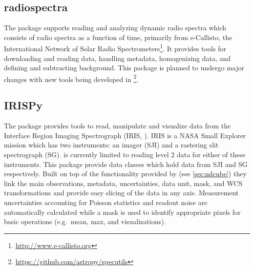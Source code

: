 \subsection{radiospectra}
The  package supports reading and analyzing dynamic radio spectra which consists of radio spectra as a function of time, primarily from e-Callisto, the International Network of Solar Radio Spectrometers\footnote{\url{http://www.e-callisto.org}}.
It provides tools for downloading and reading data, handling metadata, homogenizing data, and defining and subtracting background.
This package is planned to undergo major changes with new tools being developed in \footnote{\url{https://github.com/astropy/specutils}}.

\subsection{IRISPy}
\label{sec:irispy}

The  package provides tools to read, manipulate and visualize data from the Interface Region Imaging Spectrograph (IRIS, \citealt{DePontieu2014}).
IRIS is a NASA Small Explorer mission which has two instruments: an imager (SJI) and a rastering slit spectrograph (SG).
 is currently limited to reading level 2 data for either of these instruments.
This package provide data classes which hold data from SJI and SG respectively.
Built on top of the functionality provided by  (see \autoref{sec:ndcube}) they link the main observations, metadata, uncertainties, data unit, mask, and WCS transformations and provide easy slicing of the data in any axis.
Measurement uncertainties accounting for Poisson statistics and readout noise are automatically calculated while a mask is used to identify appropriate pixels for basic operations (e.g.\ mean, max, and visualizations).
